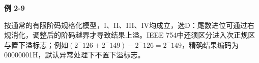 {\color{ink}\bfseries 例 2-9}\par\vspace{1bp}按通常的有限阶码规格化模型，I、II、III、IV均成立，选D：尾数进位可通过右规消化，调整后的阶码越界才导致结果上溢。IEEE 754中还须区分进入次正规区与置下溢标志；例如\((2^-126+\allowbreak{}2^-149)-2^-126=\allowbreak{}2^-149\)，精确结果编码为00000001H，默认异常处理下不置下溢标志。
